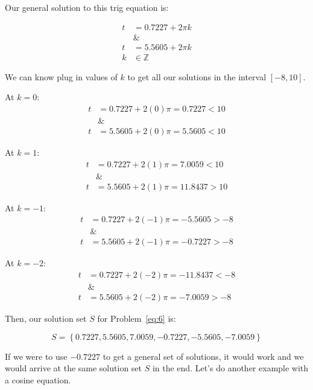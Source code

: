 \documentclass[12pt]{article}
\theoremstyle{definition}
\begin{document}
Our general solution to this trig equation is:

\begin{align}
    t         & = 0.7227 + 2\pi k \\
    \nonumber & \&                \\
    t         & = 5.5605 + 2\pi k \\
    k         & \in \mathbb{Z}
\end{align}

We can know plug in values of $k$ to get all our solutions in the interval $[-8, 10]$.

At $k=0$:
\begin{align}
    t         & = 0.7227 + 2(0)\pi = 0.7227 < 10 \\
    \nonumber & \&                               \\
    t         & = 5.5605 + 2(0)\pi = 5.5605 < 10
\end{align}

At $k=1$:
\begin{align}
    t         & = 0.7227 + 2(1)\pi = 7.0059 < 10  \\
    \nonumber & \&                                \\
    t         & = 5.5605 + 2(1)\pi = 11.8437 > 10
\end{align}

At $k=-1$:
\begin{align}
    t         & = 0.7227 + 2(-1)\pi = -5.5605 > -8 \\
    \nonumber & \&                                 \\
    t         & = 5.5605 + 2(-1)\pi = -0.7227 > -8
\end{align}

At $k=-2$:
\begin{align}
    t         & = 0.7227 + 2(-2)\pi = -11.8437 < -8 \\
    \nonumber & \&                                  \\
    t         & = 5.5605 + 2(-2)\pi = -7.0059 > -8
\end{align}

Then, our solution set $S$ for Problem~\eqref{eq:6} is:

\begin{equation}
    S = \left\{ 0.7227, 5.5605, 7.0059, -0.7227, -5.5605, -7.0059 \right\}
\end{equation}

If we were to use $-0.7227$ to get a general set of solutions, it would work and we would arrive at the same solution set $S$ in the end.
Let's do another example with a cosine equation.
\end{document}
